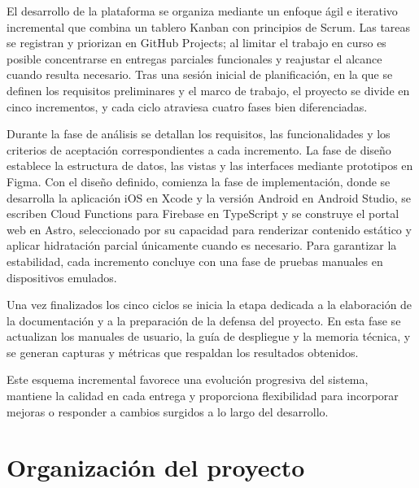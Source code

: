 \begin{large}

El desarrollo de la plataforma se organiza mediante un enfoque ágil e iterativo incremental que combina un tablero Kanban con principios de Scrum. Las tareas se registran y priorizan en GitHub Projects; al limitar el trabajo en curso es posible concentrarse en entregas parciales funcionales y reajustar el alcance cuando resulta necesario. Tras una sesión inicial de planificación, en la que se definen los requisitos preliminares y el marco de trabajo, el proyecto se divide en cinco incrementos, y cada ciclo atraviesa cuatro fases bien diferenciadas.

Durante la fase de análisis se detallan los requisitos, las funcionalidades y los criterios de aceptación correspondientes a cada incremento. La fase de diseño establece la estructura de datos, las vistas y las interfaces mediante prototipos en Figma. Con el diseño definido, comienza la fase de implementación, donde se desarrolla la aplicación iOS en Xcode y la versión Android en Android Studio, se escriben Cloud Functions para Firebase en TypeScript y se construye el portal web en Astro, seleccionado por su capacidad para renderizar contenido estático y aplicar hidratación parcial únicamente cuando es necesario. Para garantizar la estabilidad, cada incremento concluye con una fase de pruebas manuales en dispositivos emulados.

Una vez finalizados los cinco ciclos se inicia la etapa dedicada a la elaboración de la documentación y a la preparación de la defensa del proyecto. En esta fase se actualizan los manuales de usuario, la guía de despliegue y la memoria técnica, y se generan capturas y métricas que respaldan los resultados obtenidos.

Este esquema incremental favorece una evolución progresiva del sistema, mantiene la calidad en cada entrega y proporciona flexibilidad para incorporar mejoras o responder a cambios surgidos a lo largo del desarrollo.

\end{large}

\section{Organización del proyecto}

